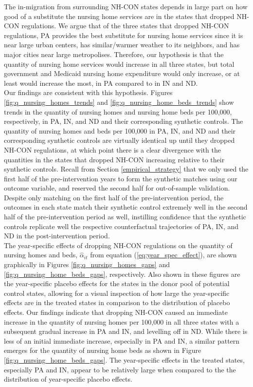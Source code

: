 \documentclass[../Main.tex]{subfiles}
\begin{document}
\indent The in-migration from surrounding NH-CON states depends in large part on how good of a substitute the nursing home services are in the states that dropped NH-CON regulations. We argue that of the three states that dropped NH-CON regulations, PA provides the best substitute for nursing home services since it is near large urban centers, has similar/warmer weather to its neighbors, and has major cities near large metropolises. Therefore, our hypothesis is that the quantity of nursing home services would increase in all three states, but total government and Medicaid nursing home expenditure would only increase, or at least would increase the most, in PA compared to in IN and ND.\\
\indent Our findings are consistent with this hypothesis. Figures \ref{fig:q_nursing_homes_trends} and \ref{fig:q_nursing_home_beds_trends} show trends in the quantity of nursing homes and nursing home beds per 100,000, respectively, in PA, IN, and ND and their corresponding synthetic controls. The quantity of nursing homes and beds per 100,000 in PA, IN, and ND and their corresponding synthetic controls are virtually identical up until they dropped NH-CON regulations, at which point there is a clear divergence with the quantities in the states that dropped NH-CON increasing relative to their synthetic controls. Recall from Section \ref{empirical_strategy} that we only used the first half of the pre-intervention years to form the synthetic matches using our outcome variable, and reserved the second half for out-of-sample validation. Despite only matching on the first half of the pre-intervention period, the outcomes in each state match their synthetic control extremely well in the second half of the pre-intervention period as well, instilling confidence that the synthetic controls replicate well the respective counterfactual trajectories of PA, IN, and ND in the post-intervention period.\\
\indent The year-specific effects of dropping NH-CON regulations on the quantity of nursing homes and beds, $\hat{\alpha}_{it}$ from equation (\ref{eq:year_spec_effect}), are shown graphically in Figures \ref{fig:q_nursing_homes_gaps} and \ref{fig:q_nursing_home_beds_gaps}, respectively. Also shown in these figures are the year-specific placebo effects for the states in the donor pool of potential control states, allowing for a visual inspection of how large the year-specific effects are in the treated states in comparison to the distribution of placebo effects. Our findings indicate that dropping NH-CON caused an immediate increase in the quantity of nursing homes per 100,000 in all three states with a subsequent gradual increase in PA and IN, and levelling off in ND. While there is less of an initial immediate increase, especially in PA and IN, a similar pattern emerges for the quantity of nursing home beds as shown in Figure \ref{fig:q_nursing_home_beds_gaps}. The year-specific effects in the treated states, especially PA and IN, appear to be relatively large when compared to the the distribution of year-specific placebo effects.\\
\end{document}
